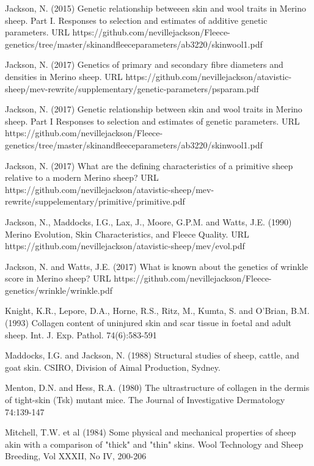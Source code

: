 \documentclass[titlepage]{article}  %
\begin{document}
\begin{thebibliography}{99}
Jackson, N. (2015) Genetic relationship betweeen skin and wool traits in Merino sheep. Part I. Responses to selection and estimates of additive genetic parameters. URL https://github.com/nevillejackson/Fleece-genetics/tree/master/skinandfleeceparameters/ab3220/skinwool1.pdf

Jackson, N. (2017) Genetics of primary and secondary fibre diameters and densities in Merino sheep. URL https://github.com/nevillejackson/atavistic-sheep/mev-rewrite/supplementary/genetic-parameters/psparam.pdf

Jackson, N. (2017) Genetic relationship between skin and wool traits in Merino sheep. Part I Responses to selection and estimates of genetic parameters. URL https://github.com/nevillejackson/Fleece-genetics/tree/master/skinandfleeceparameters/ab3220/skinwool1.pdf

Jackson, N. (2017) What are the defining characteristics of a primitive sheep relative to a modern Merino sheep? URL https://github.com/nevillejackson/atavistic-sheep/mev-rewrite/suppelementary/primitive/primitive.pdf

Jackson, N., Maddocks, I.G., Lax, J., Moore, G.P.M. and Watts, J.E. (1990) Merino Evolution, Skin Characteristics, and Fleece Quality. URL https://github.com/nevillejackson/atavistic-sheep/mev/evol.pdf 

Jackson, N. and Watts, J.E. (2017) What is known about the genetics of wrinkle score in Merino sheep? URL https://github.com/nevillejackson/Fleece-genetics/wrinkle/wrinkle.pdf

Knight, K.R., Lepore, D.A., Horne, R.S., Ritz, M., Kumta, S. and O'Brian, B.M. (1993) Collagen content of uninjured skin and scar tissue in foetal and adult sheep. Int. J. Exp. Pathol. 74(6):583-591

Maddocks, I.G. and Jackson, N. (1988) Structural studies of sheep, cattle, and goat skin. CSIRO, Division of Aimal Production, Sydney.

Menton, D.N. and Hess, R.A. (1980) The ultrastructure of collagen in the dermis of tight-skin (Tsk) mutant mice. The Journal of Investigative Dermatology 74:139-147

Mitchell, T.W. et al (1984) Some physical and mechanical properties of sheep akin with a comparison of "thick" and "thin" skins.  Wool Technology and Sheep Breeding, Vol XXXII, No IV, 200-206


\end{thebibliography}
\end{document}
